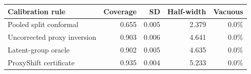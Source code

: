 \begin{tabular}{lrrrr}
\hline
Calibration rule & Coverage & SD & Half-width & Vacuous \\
\hline
Pooled split conformal & 0.655 & 0.005 & 2.379 & 0.0\% \\
Uncorrected proxy inversion & 0.903 & 0.006 & 4.641 & 0.0\% \\
Latent-group oracle & 0.902 & 0.005 & 4.635 & 0.0\% \\
ProxyShift certificate & 0.935 & 0.004 & 5.233 & 0.0\% \\
\hline\end{tabular}
